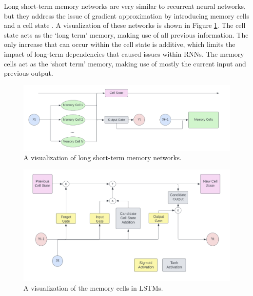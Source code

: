 Long short-term memory networks are very similar to recurrent neural networks, but they address the issue of gradient approximation by introducing memory cells and a cell state \citep{hochreiter1997long}. A visualization of these networks is shown in Figure \ref{fig:LSTM}. The cell state acts as the `long term' memory, making use of all previous information. The only increase that can occur within the cell state is additive, which limits the impact of long-term dependencies that caused issues within RNNs. The memory cells act as the `short term' memory, making use of mostly the current input and previous output.

\begin{figure}[ht]
    \centering
    \includegraphics[width=0.9\linewidth]{"Figures/LSTM_Architecture.png"}
    \caption{A visualization of long short-term memory networks.}
    \label{fig:LSTM}
\end{figure}

\begin{figure}[ht]
    \centering
    \includegraphics[width=0.9\linewidth]{"Figures/LSTM_Memory_Cell.png"}
    \caption{A visualization of the memory cells in LSTMs.}
    \label{fig:MemoryCells}
\end{figure}

